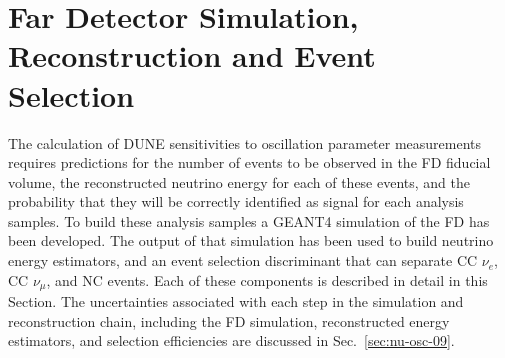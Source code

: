 \section{Far Detector Simulation, Reconstruction and Event Selection}
\label{sec:physics-lbnosc-FD}


The calculation of DUNE sensitivities to oscillation parameter measurements requires predictions for the number of events to be observed in the FD fiducial volume, the reconstructed neutrino energy for each of these events, and the probability that they will be correctly identified as signal for each analysis samples. To build these analysis samples a  GEANT4 simulation of the FD has been developed. The output of that simulation has been used to build neutrino energy estimators, and an event selection discriminant that can separate CC $\nu_{e}$, CC $\nu_{\mu}$, and NC events. Each of these components is described in detail in this Section. The uncertainties associated with each step in the simulation and reconstruction chain, including the FD simulation, reconstructed energy estimators, and selection efficiencies are discussed in Sec.~\ref{sec:nu-osc-09}. 


